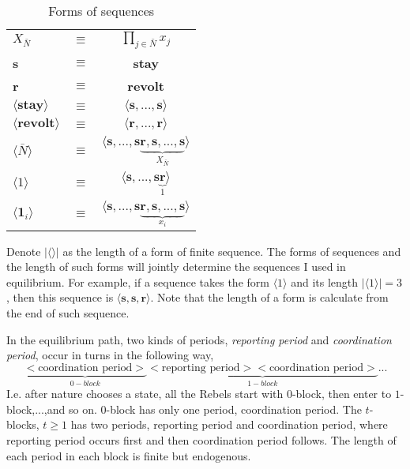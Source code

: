 \documentclass[12pt,letter]{article}
\theoremstyle{definition}
\theoremstyle{remark}
\theoremstyle{claim}
\begin{document}
\begin{table}[t]
\caption{Forms of sequences}
\label{Table_msg_form}
\begin{center}
\begin{tabular}{l c c}
$X_{\bar{N}}$ 								& $\equiv$ 			& $\prod_{j\in \bar{N}}x_j$  \\
\textbf{s}										& $\equiv$ 			& \textbf{stay}  \\
\textbf{r}										& $\equiv$ 			& \textbf{revolt}  \\
$\langle \textbf{stay} \rangle$ 		& $\equiv$ 			& $\langle \textbf{s},...,\textbf{s}\rangle$  \\
$\langle \textbf{revolt} \rangle$ 	& $\equiv$ 			& $\langle \textbf{r},...,\textbf{r}\rangle$  \\
$\langle  \bar{N} \rangle$ 				& $\equiv$ 			& $\langle \textbf{s},...,\textbf{s}\underbrace{\textbf{r},\textbf{s},...,\textbf{s}}_{X_{ \bar{N}}}\rangle$  \\

$\langle 1 \rangle$	 					& $\equiv$ 			& $\langle \textbf{s},...,\textbf{s}\underbrace{\textbf{r}}_{1}\rangle$  \\
$\langle \mathbf{1}_i \rangle$	 	& $\equiv$ 			& $\langle \textbf{s},...,\textbf{s}\underbrace{\textbf{r},\textbf{s},...,\textbf{s}}_{x_i}\rangle$  \\
\end{tabular}
\end{center}
\end{table}

Denote $|\langle\rangle|$ as the length of a form of finite sequence. The forms of sequences and the length of such forms will jointly determine the sequences I used in equilibrium. For example, if a sequence takes the form $\langle 1 \rangle$ and its length $|\langle 1 \rangle|=3$, then this sequence is $\langle \textbf{s},\textbf{s},\textbf{r}\rangle$. Note that the length of a form is calculate from the end of such sequence.

In the equilibrium path, two kinds of periods, \textit{reporting period} and \textit{coordination period}, occur in turns in the following way,
\[\underbrace{<\text{coordination period}>}_{0-block}\underbrace{<\text{reporting period}><\text{coordination period}>}_{1-block}...\]
I.e. after nature chooses a state, all the Rebels start with $0$-block, then enter to $1$-block,...,and so on. $0$-block has only one period, coordination period. The $t$-blocks, $t\geq 1$ has two periods, reporting period and coordination period, where reporting period occurs first and then coordination period follows. The length of each period in each block is finite but endogenous.
\end{document}
